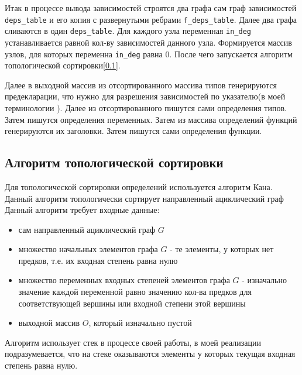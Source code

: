 Итак в процессе вывода зависимостей строятся два графа сам граф зависимостей \verb|deps_table| и его копия с развернутыми ребрами \verb|f_deps_table|.
Далее два графа сливаются в один \verb|deps_table|.
Для каждого узла переменная \verb|in_deg| устанавливается равной кол-ву зависимостей данного узла.
Формируется массив узлов, для которых переменна \verb|in_deg| равна 0.
После чего запускается алгоритм топологической сортировки[\ref{pass:ordering:topsort}].

Далее в выходной массив из отсортированного массива типов генерируются предекларации, что нужно для разрешения зависимостей по указателю(в моей терминологии ).
Далее из отсортированного пишутся сами определения типов.
Затем пишутся определения переменных.
Затем из массива определений функций генерируются их заголовки.
Затем пишутся сами определения функции.

\subsection{Алгоритм топологической сортировки}
\label{pass:ordering:topsort}

Для топологической сортировки определений используется алгоритм Кана. Данный алгоритм топологически сортирует направленный ациклический граф
Данный алгоритм требует входные данные: 
\begin{itemize}
\item сам направленный ациклический граф $G$
\item множество начальных элементов графа $G$ - те элементы, у которых нет предков, т.е. их входная степень равна нулю
\item множество переменных входных степеней элементов графа $G$ - изначально значение каждой переменной равно значению кол-ва предков для соответствующей вершины или входной степени этой вершины
\item выходной массив $O$, который изначально пустой
\end{itemize}

Алгоритм использует стек в процессе своей работы, в моей реализации подразумевается, что на стеке оказываются элементы у которых текущая входная степень равна нулю.

